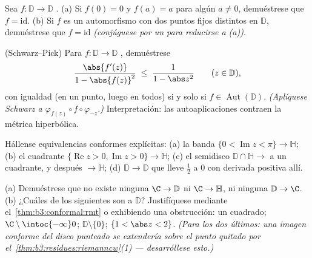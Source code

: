 \begin{exercise}[$\star$]\label{exo:b3:conformal:2}
Sea $f \colon \mathbb D \to \mathbb D$
. (a) Si $f(0) = 0$ y
$f(a) = a$ para algún $a \neq 0$, demuéstrese que $f
= \mathrm{id}$. (b) Si $f$ es un automorfismo con dos puntos fijos
distintos en $\mathbb D$, demuéstrese que $f = \mathrm{id}$
\emph{(conjúguese por un  para reducirse a (a))}.
\end{exercise}

\begin{exercise}[$\star\star$]\label{exo:b3:conformal:3}
(Schwarz--Pick) Para $f\colon \mathbb D \to
\mathbb D$ , demuéstrese
\[
\frac{\abs{f'(z)}}{1 - \abs{f(z)}^2} \;\leq\;
\frac{1}{1 - \abs z^2}
\qquad (z \in \mathbb D),
\]
con igualdad (en un punto, luego en todos) si y solo si $f \in
\operatorname{Aut}(\mathbb D)$. \emph{(Aplíquese Schwarz a
$\varphi_{f(z)}\circ
f\circ\varphi_{-z}$.)} Interpretación: las autoaplicaciones
 contraen la métrica
hiperbólica.
\end{exercise}

\begin{exercise}[$\star\star$]\label{exo:b3:conformal:4}
Hállense equivalencias conformes explícitas: (a) la banda
$\{0 < \operatorname{Im}z < \pi\} \to \mathbb H$; (b) el cuadrante
$\{\operatorname{Re}z > 0,
\operatorname{Im}z > 0\} \to \mathbb H$; (c) el semidisco
$\mathbb D\cap\mathbb H \to$ a un cuadrante, y después $\to \mathbb H$;
(d) $\mathbb D \to \mathbb D$ que lleve $\frac12$ a $0$ con derivada
positiva allí.
\end{exercise}

\begin{exercise}[$\star\star$]\label{exo:b3:conformal:5}
(a) Demuéstrese que no existe ninguna
$\C \to \mathbb D$ ni $\C \to
\mathbb H$, ni ninguna $\mathbb D \to \C$. (b) ¿Cuáles de los siguientes
son  a
$\mathbb D$? Justifíquese mediante el~\cref{thm:b3:conformal:rmt} o
exhibiendo una obstrucción: un cuadrado; $\C\setminus\intoc{-\infty}0$;
$\mathbb D\setminus\{0\}$; $\{1 < \abs z < 2\}$.
\emph{(Para los dos últimos: una imagen conforme del disco punteado se
extendería sobre el punto quitado por
el~\cref{thm:b3:residues:riemanncw}(1) --- desarróllese esto.)}
\end{exercise}

